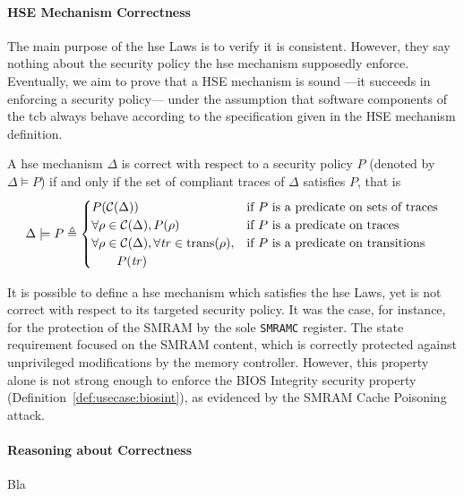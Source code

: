 \paragraph{HSE Mechanism Correctness}
%
The main purpose of the \ac{hse} Laws is to verify it is consistent.
%
However, they say nothing about the security policy the \ac{hse} mechanism
supposedly enforce.
%
Eventually, we aim to prove that a HSE mechanism is sound ---it succeeds in
enforcing a security policy--- under the assumption that software components of
the \ac{tcb} always behave according to the specification given in the HSE
mechanism definition.

\begin{definition}
  A \ac{hse} mechanism $\Delta$ is correct with respect to a security policy $P$
  (denoted by $\Delta \models P$) if and only if the set of compliant traces of
  $\Delta$ satisfies $P$, that is
  \[
    \Delta \models P \triangleq
    \begin{cases}
      P(\mathcal{C}(\Delta)) & \text{if } P \text{ is a predicate on sets of
        traces} \\
      \forall \rho \in \mathcal{C}(\Delta), P(\rho) & \text{if } P \text{ is a
        predicate on traces} \\
      \forall \rho \in \mathcal{C}(\Delta), \forall \mathit{tr} \in
      \mathrm{trans}(\rho), & \text{if }P \text{ is a predicate on
        transitions} \\
      \qquad P(\mathit{tr}) &
    \end{cases}
  \]
\end{definition}

It is possible to define a \ac{hse} mechanism which satisfies the \ac{hse} Laws,
yet is not correct with respect to its targeted security policy.
%
It was the case, for instance, for the protection of the SMRAM by the sole
\texttt{SMRAMC} register.
%
The state requirement focused on the SMRAM content, which is correctly protected
against unprivileged modifications by the memory controller.
%
However, this property alone is not strong enough to enforce the BIOS Integrity
security property (Definition~\ref{def:usecase:biosint}), as evidenced by the
SMRAM Cache Poisoning attack.

\paragraph{Reasoning about Correctness}
%
Bla

